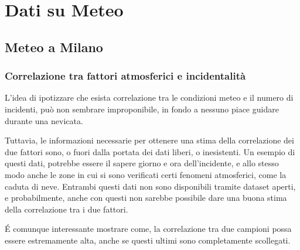 \documentclass[a4paper]{report}
\begin{document}
\chapter{Dati su Meteo}

\section{Meteo a Milano}

\subsection{Correlazione tra fattori atmosferici e incidentalità}

L'idea di ipotizzare che esista correlazione tra le condizioni meteo e il numero 
di incidenti, può non sembrare improponibile, in fondo a nessuno piace guidare 
durante una nevicata.

Tuttavia, le informazioni necessarie per ottenere una stima della correlazione 
dei due fattori sono, o fuori dalla portata dei dati liberi, o inesistenti. 
Un esempio di questi dati, potrebbe essere il sapere giorno e ora 
dell'incidente, e allo stesso modo anche le zone in cui si sono verificati certi 
fenomeni atmosferici, come la caduta di neve. 
Entrambi questi dati non sono disponibili tramite dataset aperti, e probabilmente, 
anche con questi non sarebbe possibile dare una buona stima della correlazione 
tra i due fattori.

\'E comunque interessante mostrare come, la correlazione tra due campioni possa essere 
estremamente alta, anche se questi ultimi sono completamente scollegati.
\end{document}
